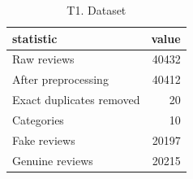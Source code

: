 \begin{table}
\caption{T1. Dataset}
\begin{tabular}{lr}
\toprule
statistic & value \\
\midrule
Raw reviews & 40432 \\
After preprocessing & 40412 \\
Exact duplicates removed & 20 \\
Categories & 10 \\
Fake reviews & 20197 \\
Genuine reviews & 20215 \\
\bottomrule
\end{tabular}
\end{table}
